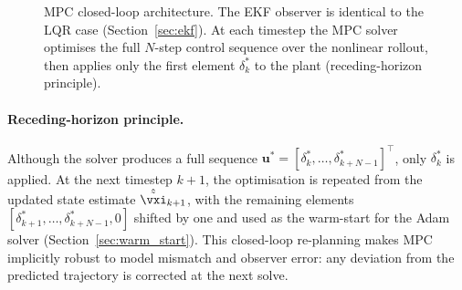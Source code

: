 \begin{figure}[htbp]
\centering
{}
\caption{MPC closed-loop architecture.
         The EKF observer is identical to the LQR case (Section~\ref{sec:ekf}).
         At each timestep the MPC solver optimises the full $N$-step control
         sequence over the nonlinear rollout, then applies only the first
         element $\delta_k^*$ to the plant (receding-horizon principle).}
\label{fig:mpc_block}
\end{figure}

\paragraph{Receding-horizon principle.}
Although the solver produces a full sequence
$\mathbf{u}^* = [\delta_k^*, \ldots, \delta_{k+N-1}^*]^\top$,
only $\delta_k^*$ is applied.
At the next timestep $k+1$, the optimisation is repeated from the updated
state estimate $\hat{\tilde{\vxi}}_{k+1}$, with the remaining elements
$[\delta_{k+1}^*, \ldots, \delta_{k+N-1}^*, 0]$ shifted by one and used as
the warm-start for the Adam solver (Section~\ref{sec:warm_start}).
This closed-loop re-planning makes MPC implicitly robust to model mismatch and
observer error: any deviation from the predicted trajectory is corrected at the
next solve.

